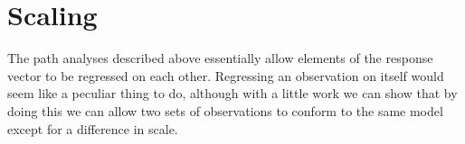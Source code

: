 \documentclass{article}
\begin{document}
\section{Scaling}

The path analyses described above essentially allow elements of the response vector to be regressed on each other. Regressing an observation on itself would seem like a peculiar thing to do, although with a little work we can show that by doing this we can allow two sets of observations to conform to the same model except for a difference in scale. 



\ifalone
\end{document}
